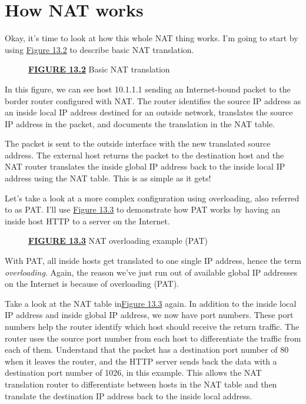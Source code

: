 \section{How NAT works}

Okay, it's time to look at how this whole NAT thing works. I'm going to
start by using \protect\hyperlink{c13.xhtmlux5cux23figure13-2}{Figure
13.2} to describe basic NAT translation.

\begin{figure}
\centering

\caption{{\protect\hyperlink{c13.xhtmlux5cux23figureanchor13-2}{\textbf{FIGURE
13.2}} Basic NAT translation}}
\end{figure}

In this figure, we
can see host 10.1.1.1 sending an Internet-bound packet to the border
router configured with NAT. The router identifies the source IP address
as an inside local IP address destined for an outside network,
translates the source IP address in the packet, and documents the
translation in the NAT table.

The packet is sent to the outside interface with the new translated
source address. The external host returns the packet to the destination
host and the NAT router translates the inside global IP address back to
the inside local IP address using the NAT table. This is as simple as it
gets!

Let's take a look at a more complex configuration using overloading,
also referred to as PAT. I'll use
\protect\hyperlink{c13.xhtmlux5cux23figure13-3}{Figure 13.3} to
demonstrate how PAT works by having an inside host HTTP to a server on
the Internet.

\begin{figure}
\centering

\caption{{\protect\hyperlink{c13.xhtmlux5cux23figureanchor13-3}{\textbf{FIGURE
13.3}} NAT overloading example (PAT)}}
\end{figure}

With PAT, all inside hosts get translated to one single IP address,
hence the term \emph{overloading}. Again, the reason we've just run out
of available global IP addresses on the Internet is because of
overloading (PAT).

Take a look at the NAT table
in\protect\hyperlink{c13.xhtmlux5cux23figure13-3}{Figure 13.3} again. In
addition to the inside local IP address and inside global IP address, we
now have port numbers. These port numbers help the router identify which
host should receive the return traffic. The router uses the source port
number from each host to differentiate the traffic from each of them.
Understand that the packet has a destination port number of 80 when it
leaves the router, and the HTTP server sends back the data with a
destination port number of 1026, in this example. This allows the NAT
translation router to differentiate between hosts in the NAT table and
then translate the destination IP address back to the inside local
address.

